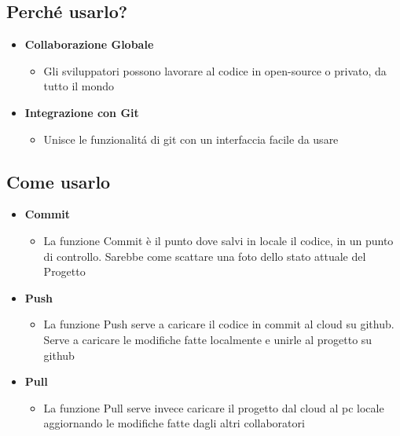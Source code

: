 \documentclass[a4paper,12pt]{article}
\begin{document}
 \begin{center}
    \subsection*{Perché usarlo?}
 \end{center}
 \begin{itemize}
    \item \textbf{Collaborazione Globale}
    \begin{itemize}
        \item Gli sviluppatori possono lavorare al codice in open-source o privato, da tutto il mondo
    \end{itemize}
    \item \textbf{Integrazione con Git}
    \begin{itemize}
        \item Unisce le funzionalitá di git con un interfaccia facile da usare
    \end{itemize}
 \end{itemize}

 \begin{center}
    \subsection *{Come usarlo}
 \end{center}
 \begin{itemize}
    \item  \textbf{Commit}
    \begin{itemize}
        \item La funzione Commit è il punto dove salvi in locale il codice, in un punto di controllo. Sarebbe come scattare una foto dello stato attuale del Progetto
    \end{itemize}
    \item \textbf{Push}
    \begin{itemize}
        \item La funzione Push serve a caricare il codice in commit al cloud su github. Serve a caricare le modifiche fatte localmente e unirle al progetto su github
    \end{itemize}
    \item \textbf{Pull}
    \begin{itemize}
        \item La funzione Pull serve invece caricare il progetto dal cloud al pc locale aggiornando le modifiche fatte dagli altri collaboratori
    \end{itemize}
 \end{itemize}
\end{document}
